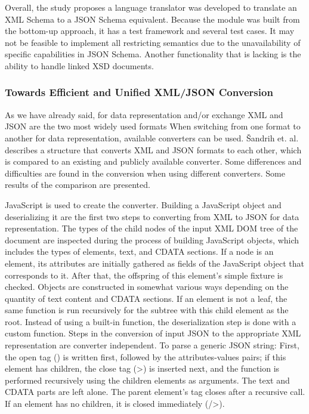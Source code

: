 Overall, the study proposes a language translator was developed to translate an
XML Schema to a JSON Schema equivalent. Because the module was built from the
bottom-up approach, it has a test framework and several test cases. It may not
be feasible to implement all restricting semantics due to the unavailability of
specific capabilities in JSON Schema. Another functionality that is lacking is
the ability to handle linked XSD documents.

\subsubsection{Towards Efficient and Unified XML/JSON Conversion}
As we have already said, for data representation and/or exchange XML and JSON
are the two most widely used formats When switching from one format to another
for data representation, available converters can be used. Šandrih et. al.
\autocite{Sandrih2017} describes a structure that converts XML and JSON formats
to each other, which is compared to an existing and publicly available
converter. Some differences and difficulties are found in the conversion when
using different converters. Some results of the comparison are presented.

JavaScript is used to create the converter. Building a JavaScript object and
deserializing it are the first two steps to converting from XML to JSON for data
representation. The types of the child nodes of the input XML DOM tree of the
document are inspected during the process of building JavaScript objects, which
includes the types of elements, text, and CDATA sections. If a node is an
element, its attributes are initially gathered as fields of the JavaScript
object that corresponds to it. After that, the offspring of this element's
simple fixture is checked. Objects are constructed in somewhat various ways
depending on the quantity of text content and CDATA sections. If an element is
not a leaf, the same function is run recursively for the subtree with this child
element as the root. Instead of using a built-in function, the deserialization
step is done with a custom function. Steps in the conversion of input JSON to
the appropriate XML representation are converter independent. To parse a generic
JSON string: First, the open tag () is written first, followed by the
attributes-values pairs; if this element has children, the close tag (>) is
inserted next, and the function is performed recursively using the children
elements as arguments. The text and CDATA parts are left alone. The parent
element's tag closes after a recursive call. If an element has no children, it
is closed immediately (/>).

